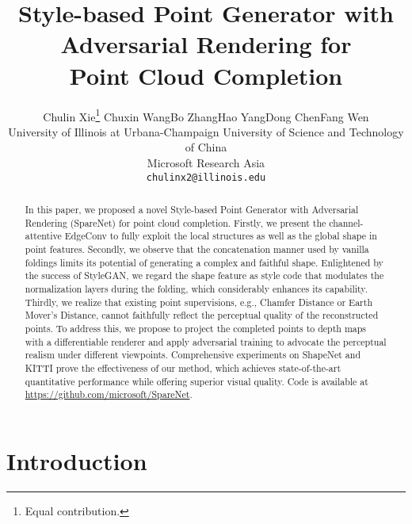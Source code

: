 \documentclass[final]{cvpr}
\newcommand*\samethanks[1][\value{footnote}]{\footnotemark[#1]}
\begin{document}
\title{Style-based Point Generator with Adversarial Rendering for \\Point Cloud Completion}

\author{Chulin Xie\thanks{Equal contribution.}  \qquad Chuxin Wang\samethanks \qquad Bo Zhang\qquad Hao Yang\qquad Dong Chen\qquad Fang Wen \\ 
University of Illinois at Urbana-Champaign  \qquad University of Science and Technology of China \qquad \\ Microsoft Research Asia\\
{\tt\small chulinx2@illinois.edu}    
}

\maketitle

\begin{abstract}





In this paper, we proposed a novel Style-based Point Generator with Adversarial Rendering (SpareNet) for point cloud completion. 
Firstly, we present the channel-attentive EdgeConv to fully exploit the local structures as well as the global shape in point features. 
Secondly, we observe that the concatenation manner used by vanilla foldings limits its potential of generating a complex and faithful shape. Enlightened by the success of StyleGAN, we regard the shape feature as style code that modulates the normalization layers during the folding, which considerably enhances its capability. 
Thirdly, we realize that existing point supervisions, e.g., Chamfer Distance or Earth Mover's Distance, cannot faithfully reflect the perceptual quality of the reconstructed points. To address this, we propose to project the completed points to depth maps with a differentiable renderer and apply adversarial training to advocate the perceptual realism under different viewpoints. Comprehensive experiments on ShapeNet and KITTI prove the effectiveness of our method, which achieves state-of-the-art quantitative performance while offering superior visual quality. Code is available at \href{https://github.com/microsoft/SpareNet}{https://github.com/microsoft/SpareNet}.  

\end{abstract}

\section{Introduction}
\end{document}
